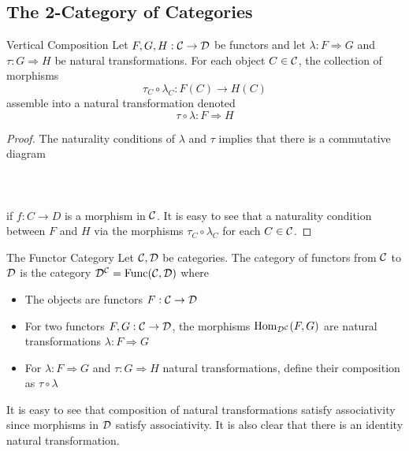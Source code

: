 \documentclass[a4paper]{article}
\begin{document}
\subsection{The 2-Category of Categories}
\begin{prp}{Vertical Composition}{} Let $F,G,H:\mathcal{C}\to\mathcal{D}$ be functors and let $\lambda:F\Rightarrow G$ and $\tau:G\Rightarrow H$ be natural transformations. For each object $C\in\mathcal{C}$, the collection of morphisms $$\tau_C\circ\lambda_C:F(C)\to H(C)$$ assemble into a natural transformation denoted $$\tau\circ\lambda:F\Rightarrow H$$ \tcbline
\begin{proof}
The naturality conditions of $\lambda$ and $\tau$ implies that there is a commutative diagram \\~\\
\\~\\
if $f:C\to D$ is a morphism in $\mathcal{C}$. It is easy to see that a naturality condition between $F$ and $H$ via the morphisms $\tau_C\circ\lambda_C$ for each $C\in\mathcal{C}$. 
\end{proof}
\end{prp}

\begin{defn}{The Functor Category}{} Let $\mathcal{C},\mathcal{D}$ be categories. The category of functors from $\mathcal{C}$ to $\mathcal{D}$ is the category $\mathcal{D}^{\mathcal{C}}=\text{Func}(\mathcal{C},\mathcal{D})$ where
\begin{itemize}
\item The objects are functors $F:\mathcal{C}\to\mathcal{D}$
\item For two functors $F,G:\mathcal{C}\to\mathcal{D}$, the morphisms $\operatorname{Hom}_{\mathcal{D}^{\mathcal{C}}}(F,G)$ are natural transformations $\lambda:F\Rightarrow G$
\item For $\lambda:F\Rightarrow G$ and $\tau:G\Rightarrow H$ natural transformations, define their composition as $\tau\circ\lambda$
\end{itemize}
\end{defn}

It is easy to see that composition of natural transformations satisfy associativity since morphisms in $\mathcal{D}$ satisfy associativity. It is also clear that there is an identity natural transformation. 
\end{document}

